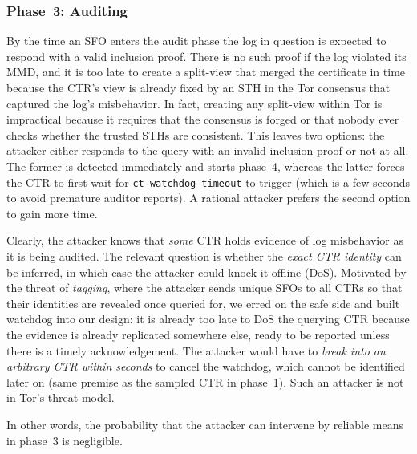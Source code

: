 \subsubsection{Phase~3: Auditing} \label{sec:analysis:pr:phase3}
By the time an SFO enters the audit phase the log in question is expected to
respond with a valid inclusion proof.  There is no such proof if the log
violated its MMD, and it is too late to create a split-view that merged the
certificate in time because the CTR's view is already fixed by an STH in the
Tor consensus that captured the log's misbehavior.  In fact, creating any
split-view within Tor is impractical because it requires that the consensus is
forged or that nobody ever checks whether the trusted STHs are consistent.
This leaves two options: the attacker either responds to the query with an
invalid inclusion proof or
	not at all.
The former is detected immediately and starts phase~4, whereas the latter forces
the CTR to first wait for \texttt{ct-watchdog-timeout} to trigger (which is a few seconds
to avoid premature auditor reports).  A rational attacker prefers the second
option to gain more time.

Clearly, the attacker knows that \emph{some} CTR holds evidence of log
misbehavior as it is being audited.  The relevant question is whether the
\emph{exact CTR identity} can be inferred, in which case the attacker could
knock it offline (DoS).  Motivated by the threat of \emph{tagging}, where the
attacker sends unique SFOs to all CTRs so that their identities are revealed
once queried for, we erred on the safe side and built watchdog into our design:
	it is already too late to DoS the querying CTR because the evidence is
	already replicated somewhere else, ready to be reported unless there is a
	timely acknowledgement.
The attacker would have to \emph{break into an arbitrary CTR within seconds} to
cancel the watchdog, which cannot be identified later on (same premise as
the sampled CTR in phase~1).  Such an attacker is not in Tor's threat model.

In other words, the probability that the attacker can intervene by reliable
means in phase~3 is negligible.

